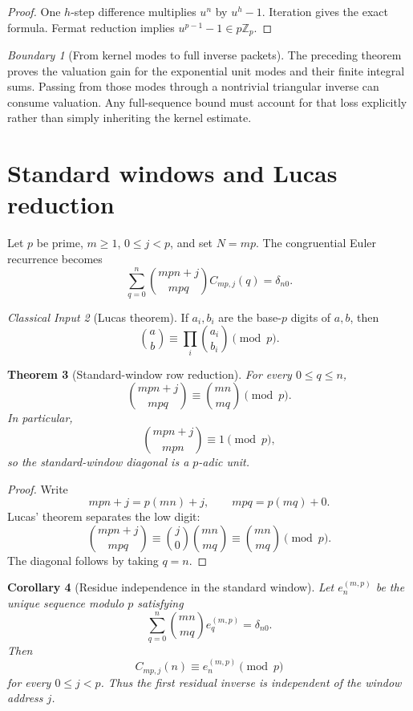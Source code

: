 \documentclass[11pt]{article}
\newtheorem{theorem}{Theorem}[section]
\newtheorem{corollary}[theorem]{Corollary}
\theoremstyle{definition}
\theoremstyle{remark}
\newtheorem{boundary}[theorem]{Boundary}
\newtheorem{classical}[theorem]{Classical Input}
\newcommand{\bbZ}{\mathbb Z}
\begin{document}
\begin{proof}
One $h$-step difference multiplies $u^n$ by $u^h-1$. Iteration gives the exact formula. Fermat reduction implies $u^{p-1}-1\in p\bbZ_p$.
\end{proof}

\begin{boundary}[From kernel modes to full inverse packets]
The preceding theorem proves the valuation gain for the exponential unit modes and their finite integral sums. Passing from those modes through a nontrivial triangular inverse can consume valuation. Any full-sequence bound must account for that loss explicitly rather than simply inheriting the kernel estimate.
\end{boundary}

\section{Standard windows and Lucas reduction}

Let $p$ be prime, $m\ge1$, $0\le j<p$, and set $N=mp$. The congruential Euler recurrence becomes
\[
\sum_{q=0}^{n}
\binom{mpn+j}{mpq}C_{mp,j}(q)
=
\delta_{n0}.
\]

\begin{classical}[Lucas theorem]
If $a_i,b_i$ are the base-$p$ digits of $a,b$, then
\[
\binom ab
\equiv
\prod_i\binom{a_i}{b_i}
\pmod p.
\]
\end{classical}

\begin{theorem}[Standard-window row reduction]
For every $0\le q\le n$,
\[
\boxed{
\binom{mpn+j}{mpq}
\equiv
\binom{mn}{mq}
\pmod p.
}
\]
In particular,
\[
\boxed{
\binom{mpn+j}{mpn}\equiv1\pmod p,
}
\]
so the standard-window diagonal is a $p$-adic unit.
\end{theorem}

\begin{proof}
Write
\[
mpn+j=p(mn)+j,
\qquad
mpq=p(mq)+0.
\]
Lucas' theorem separates the low digit:
\[
\binom{mpn+j}{mpq}
\equiv
\binom j0\binom{mn}{mq}
\equiv
\binom{mn}{mq}
\pmod p.
\]
The diagonal follows by taking $q=n$.
\end{proof}

\begin{corollary}[Residue independence in the standard window]
Let $e_n^{(m,p)}$ be the unique sequence modulo $p$ satisfying
\[
\sum_{q=0}^{n}\binom{mn}{mq}e_q^{(m,p)}=\delta_{n0}.
\]
Then
\[
\boxed{
C_{mp,j}(n)\equiv e_n^{(m,p)}\pmod p
}
\]
for every $0\le j<p$. Thus the first residual inverse is independent of the window address $j$.
\end{corollary}
\end{document}
